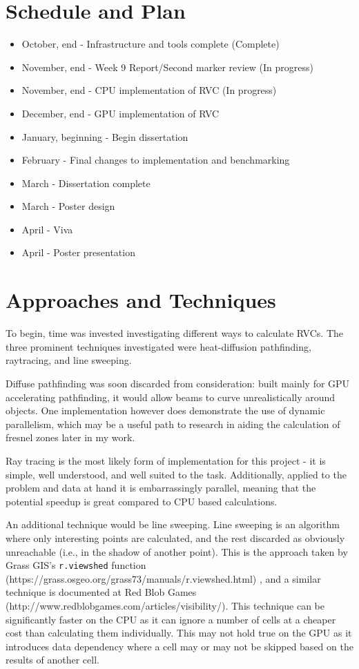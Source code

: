 \documentclass[a4paper]{article}
\begin{document}
    \section{Schedule and Plan}
    \begin{itemize}
        \item October, end - Infrastructure and tools complete (Complete)
        \item November, end - Week 9 Report/Second marker review (In progress)
        \item November, end - CPU implementation of RVC (In progress)
        \item December, end - GPU implementation of RVC
        \item January, beginning - Begin dissertation
        \item February - Final changes to implementation and benchmarking
        \item March - Dissertation complete
        \item March - Poster design
        \item April - Viva
        \item April - Poster presentation
    \end{itemize}

    \section{Approaches and Techniques}
    To begin, time was invested investigating different ways to calculate RVCs. The three prominent techniques
    investigated were heat-diffusion pathfinding, raytracing, and line sweeping.

    Diffuse pathfinding was soon discarded from consideration: built mainly for GPU accelerating pathfinding, it would
    allow beams to curve unrealistically around objects. One implementation however does demonstrate the use of dynamic
    parallelism, which may be a useful path to research in aiding the calculation of fresnel zones later in my work.

    Ray tracing is the most likely form of implementation for this project - it is simple, well understood, and well
    suited to the task. Additionally, applied to the problem and data at hand it is embarrassingly parallel, meaning
    that the potential speedup is great compared to CPU based calculations.

    An additional technique would be line sweeping. Line sweeping is an algorithm where only interesting points are
    calculated, and the rest discarded as obviously unreachable (i.e., in the shadow of another point). This is the
    approach taken by Grass GIS's \texttt{r.viewshed} function (https://grass.osgeo.org/grass73/manuals/r.viewshed.html)
    , and a similar technique is documented at Red Blob Games (http://www.redblobgames.com/articles/visibility/). This
    technique can be significantly faster on the CPU as it can ignore a number of cells at a cheaper cost than
    calculating them individually. This may not hold true on the GPU as it introduces data dependency where a cell may
    or may not be skipped based on the results of another cell.
\end{document}
